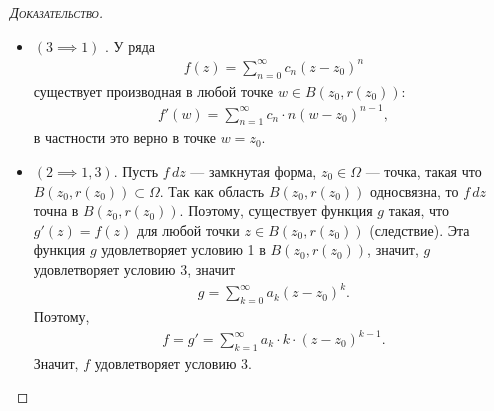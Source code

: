 \documentclass[../../main.tex]{subfiles}
\begin{document}
\begin{proof}[\normalfont\textsc{Доказательство}]
\begin{itemize}
\item $ (3 \implies 1) $ . У ряда 
 \begin{align*}
  f(z) = \sum_{n=0}^{\infty}c_n(z-z_0)^{n}
 \end{align*} существует производная в любой точке $ w \in B(z_0, r(z_0))$:
 \begin{align*}
  f'(w) = \sum_{n=1}^{\infty} c_n \cdot n(w - z_0)^{n-1},
 \end{align*} в частности это верно в точке  $ w = z_0 $.
 
\item $ (2 \implies 1, 3) $. Пусть $ f\,dz $ --- замкнутая форма, $ z_0 \in \Omega $ --- точка, такая что $ B(z_0, r(z_0)) \subset \Omega $. Так как область $ B(z_0, r(z_0)) $ односвязна, то $ f\,dz $ точна в $ B(z_0, r(z_0)) $. Поэтому, существует функция $ g $ такая, что $ g'(z) = f(z) $ для любой точки $ z \in B(z_0, r(z_0)) $ (следствие). Эта функция $ g $ удовлетворяет условию 1 в $ B(z_0, r(z_0)) $, значит, $ g $ удовлетворяет условию $ 3 $, значит
 \begin{align*}
  g = \sum_{k=0}^{\infty}a_k(z-z_0)^{k}.
 \end{align*} Поэтому,
 \begin{align*}
  f = g' = \sum_{k=1}^{\infty}a_k \cdot k \cdot (z-z_0)^{k-1}.
 \end{align*} Значит, $ f $ удовлетворяет условию 3. 
 \end{itemize}
\end{proof}
\end{document}
